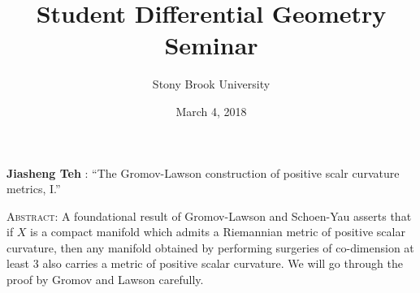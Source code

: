 \documentclass[11pt]{article}
\title{Student Differential Geometry Seminar}
\author{Stony Brook University}
\date{March 4, 2018}
\makeatletter
\newcommand{\spe@ker}{}
\newcommand{\t@lktitle}{}
\newcommand{\@ffili@tion}{}
\newcommand{\speaker}[1]{%
  \renewcommand{\spe@ker}{#1}}
\newcommand{\talktitle}[1]{%
  \renewcommand{\t@lktitle}{#1}}
\newcommand{\affiliation}[1]{%
  \renewcommand{\@ffili@tion}{#1}}
\renewenvironment{abstract}{%
  \begin{center}
    \large
    \textbf{\spe@ker} %
    : ``\t@lktitle''
  \end{center}
  \begin{trivlist}
  \item\textsc{Abstract:}}{%
  \end{trivlist}}
\makeatother
\begin{document}
\maketitle
\thispagestyle{empty}

\speaker{Jiasheng Teh}
\talktitle{The Gromov-Lawson construction of positive scalr curvature metrics, I.}

\begin{abstract}
A foundational result of Gromov-Lawson and Schoen-Yau asserts that if $X$ is a compact manifold which admits a Riemannian metric of positive scalar curvature, then any manifold obtained by performing surgeries of co-dimension at least 3 also carries a metric of positive scalar curvature. We will go through the proof by Gromov and Lawson carefully. 
\end{abstract}
\end{document}
